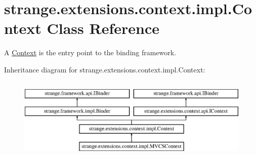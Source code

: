 \hypertarget{classstrange_1_1extensions_1_1context_1_1impl_1_1_context}{\section{strange.\-extensions.\-context.\-impl.\-Context Class Reference}
\label{classstrange_1_1extensions_1_1context_1_1impl_1_1_context}
}


A \hyperlink{classstrange_1_1extensions_1_1context_1_1impl_1_1_context}{Context} is the entry point to the binding framework.  


Inheritance diagram for strange.\-extensions.\-context.\-impl.\-Context\-:\begin{figure}[H]
\begin{center}
\leavevmode
\includegraphics[height=4.000000cm]{classstrange_1_1extensions_1_1context_1_1impl_1_1_context}
\end{center}
\end{figure}
